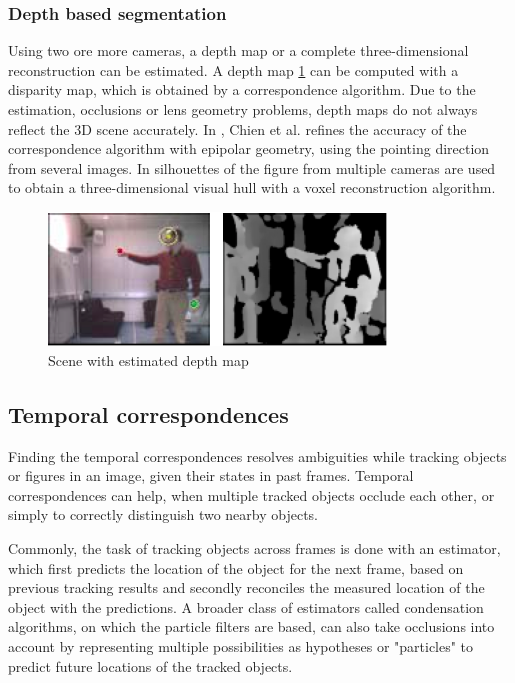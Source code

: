\subsubsection{Depth based segmentation}
Using two ore more cameras, a depth map or a complete three-dimensional reconstruction can be estimated. A depth map \ref{fig:depthmap} can be computed with a disparity map, which is obtained by a correspondence algorithm. Due to the estimation, occlusions or lens geometry problems, depth maps do not always reflect the 3D scene accurately. In \cite{Chien}, Chien et al. refines the accuracy of the correspondence algorithm with epipolar geometry, using the pointing direction from several images.
In \cite{Chu,Takahashi,VandenBergh} silhouettes of the figure from multiple cameras are used to obtain a three-dimensional visual hull with a voxel reconstruction algorithm.
\begin{figure}[h!]
\center
\includegraphics[width=0.8\textwidth]{images/seminar/depthmap.png}
\caption{Scene with estimated depth map \cite{Nickel}}
\label{fig:depthmap}
\end{figure}

\subsection{Temporal correspondences}
\label{sub:temporal-correspondences}

Finding the temporal correspondences resolves ambiguities while tracking objects or figures in an image, given their states in past frames. Temporal correspondences can help, when multiple tracked objects occlude each other,  or simply to correctly distinguish two nearby objects.

Commonly, the task of tracking objects across frames is done with an estimator, which first predicts the location of the object for the next frame, based on previous tracking results and secondly reconciles the measured location of the object with the predictions. A broader class of estimators called condensation algorithms, on which the particle filters are based, can also take occlusions into account by representing multiple possibilities as hypotheses or "particles" to predict future locations of the tracked objects.

